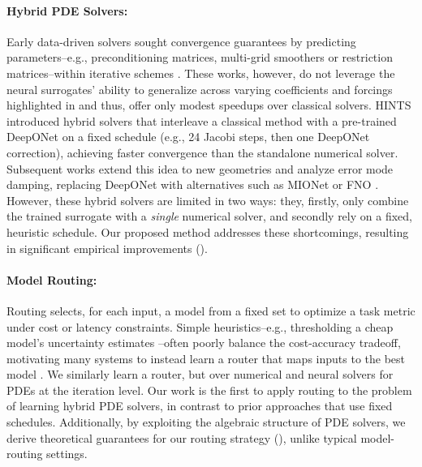 \documentclass{article}
\begin{document}
\paragraph{Hybrid PDE Solvers:}
Early data-driven solvers sought convergence guarantees by predicting parameters--e.g., preconditioning matrices, multi-grid smoothers or restriction matrices--within iterative schemes \citep{taghibakhshi2021optimization,caldana2024deep,kopanivcakova2025deeponet,huang2022learning,katrutsa2020black}. These works, however, do not leverage the neural surrogates' ability to generalize across varying coefficients and forcings highlighted in  and thus, offer only modest speedups over classical solvers. HINTS \citep{zhang2024blending} introduced hybrid solvers that interleave a classical method with a pre-trained DeepONet on a fixed schedule (e.g., 24 Jacobi steps, then one DeepONet correction), achieving faster convergence than the standalone numerical solver. 
Subsequent works extend this idea to new geometries \citep{kahana2023geometry} and analyze error mode damping, replacing DeepONet with alternatives such as MIONet \citep{jin2022mionet} \citep{hu2025hybrid} or FNO \citep{li2020fourier,cui2022fourier}. 
However, these hybrid solvers are limited in two ways: they, firstly, only combine the trained surrogate with a \textit{single} numerical solver, and secondly rely on a fixed, heuristic schedule. Our proposed method addresses these shortcomings, resulting in significant empirical improvements ().


\paragraph{Model Routing:} Routing \citep{shnitzer2023large,hu2024routerbench,ding2024hybrid,huang2025routereval} selects, for each input, a model from a fixed set to optimize a task metric under cost or latency constraints. Simple heuristics--e.g., thresholding a cheap model's uncertainty estimates \citep{chuang2024learning,chuang2025confident}--often poorly balance the cost-accuracy tradeoff, motivating many systems to instead learn a router that maps inputs to the best model \citep{hari2023tryage,mohammadshahi2024routoo,vsakota2024fly}. We similarly learn a router, but over numerical and neural solvers for PDEs at the iteration level. Our work is the first to apply routing to the problem of learning hybrid PDE solvers, in contrast to prior approaches that use fixed schedules. Additionally, by exploiting the algebraic structure of PDE solvers, we derive theoretical guarantees for our routing strategy (), unlike typical model-routing settings.
\end{document}
